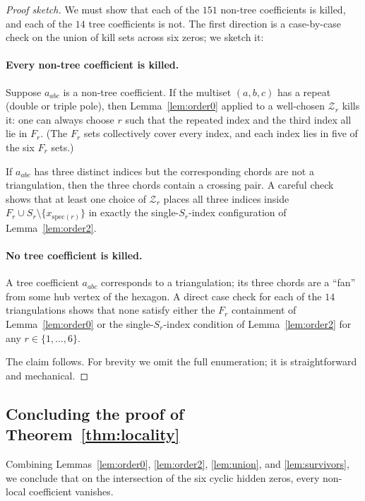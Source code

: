 \documentclass[11pt]{article}
\newcommand{\Z}{\mathcal{Z}}
\newcommand{\spec}{\mathrm{spec}}
\theoremstyle{definition}
\begin{document}
\begin{proof}[Proof sketch]
We must show that each of the $151$ non-tree coefficients is killed, and each
of the $14$ tree coefficients is not. The first direction is a case-by-case
check on the union of kill sets across six zeros; we sketch it:

\paragraph{Every non-tree coefficient is killed.}
Suppose $a_{abc}$ is a non-tree coefficient. If the multiset $(a,b,c)$ has a
repeat (double or triple pole), then Lemma~\ref{lem:order0} applied to a
well-chosen $\Z_r$ kills it: one can always choose $r$ such that the repeated
index and the third index all lie in $F_r$. (The $F_r$ sets collectively cover
every index, and each index lies in five of the six $F_r$ sets.)

If $a_{abc}$ has three distinct indices but the corresponding chords are not
a triangulation, then the three chords contain a crossing pair. A careful check
shows that at least one choice of $\Z_r$ places all three indices inside
$F_r\cup S_r\setminus\{x_{\spec(r)}\}$ in exactly the single-$S_r$-index
configuration of Lemma~\ref{lem:order2}.

\paragraph{No tree coefficient is killed.}
A tree coefficient $a_{abc}$ corresponds to a triangulation; its three chords
are a ``fan'' from some hub vertex of the hexagon. A direct case check for each
of the $14$ triangulations shows that none satisfy either the $F_r$ containment
of Lemma~\ref{lem:order0} or the single-$S_r$-index condition of
Lemma~\ref{lem:order2} for any $r\in\{1,\dots,6\}$.

The claim follows. For brevity we omit the full enumeration; it is
straightforward and mechanical.
\end{proof}

\subsection{Concluding the proof of Theorem~\ref{thm:locality}}

Combining Lemmas~\ref{lem:order0}, \ref{lem:order2}, \ref{lem:union}, and
\ref{lem:survivors}, we conclude that on the intersection of the six cyclic
hidden zeros, every non-local coefficient vanishes.
\end{document}
